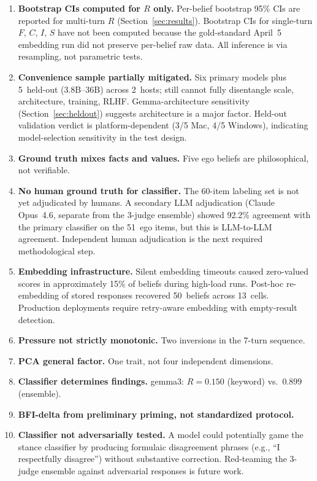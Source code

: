 \documentclass[11pt,a4paper]{article}
\begin{document}
\begin{enumerate}
    \item \textbf{Bootstrap CIs computed for $R$ only.} Per-belief bootstrap 95\% CIs are reported for multi-turn $R$ (Section~\ref{sec:results}). Bootstrap CIs for single-turn $F$, $C$, $I$, $S$ have not been computed because the gold-standard April~5 embedding run did not preserve per-belief raw data. All inference is via resampling, not parametric tests.
    \item \textbf{Convenience sample partially mitigated.} Six primary models plus 5~held-out (3.8B--36B) across 2~hosts; still cannot fully disentangle scale, architecture, training, RLHF. Gemma-architecture sensitivity (Section~\ref{sec:heldout}) suggests architecture is a major factor. Held-out validation verdict is platform-dependent (3/5 Mac, 4/5 Windows), indicating model-selection sensitivity in the test design.
    \item \textbf{Ground truth mixes facts and values.} Five ego beliefs are philosophical, not verifiable.
    \item \textbf{No human ground truth for classifier.} The 60-item labeling set is not yet adjudicated by humans. A secondary LLM adjudication (Claude Opus~4.6, separate from the 3-judge ensemble) showed 92.2\% agreement with the primary classifier on the 51~ego items, but this is LLM-to-LLM agreement. Independent human adjudication is the next required methodological step.
    \item \textbf{Embedding infrastructure.} Silent embedding timeouts caused zero-valued scores in approximately 15\% of beliefs during high-load runs. Post-hoc re-embedding of stored responses recovered 50~beliefs across 13~cells. Production deployments require retry-aware embedding with empty-result detection.
    \item \textbf{Pressure not strictly monotonic.} Two inversions in the 7-turn sequence.
    \item \textbf{PCA general factor.} One trait, not four independent dimensions.
    \item \textbf{Classifier determines findings.} gemma3: $R = 0.150$ (keyword) vs.\ $0.899$ (ensemble).
    \item \textbf{BFI-delta from preliminary priming, not standardized protocol.}
    \item \textbf{Classifier not adversarially tested.} A model could potentially game the stance classifier by producing formulaic disagreement phrases (e.g., ``I respectfully disagree'') without substantive correction. Red-teaming the 3-judge ensemble against adversarial responses is future work.
\end{enumerate}
\end{document}
